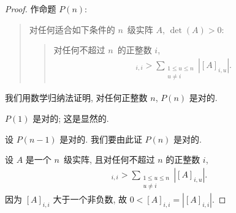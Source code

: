 \documentclass[../libro.tex]{subfiles}
\begin{document}
\begin{proof}
    作命题 \(P(n)\):
    \begin{quotation}
        对任何适合如下条件的 \(n\)~级实阵 \(A\),
        \(\det {(A)} > 0\):
        \begin{quotation}
            对任何不超过 \(n\)~的正整数 \(i\),
            \begin{align*}
                [A]_{i,i} >
                \sum_{\substack{1 \leq u \leq n \\
                u \neq i}} {|[A]_{i,u}|}.
            \end{align*}
        \end{quotation}
    \end{quotation}
    我们用数学归纳法证明,
    对任何正整数 \(n\),
    \(P(n)\) 是对的.

    \(P(1)\) 是对的; 这是显然的.

    设 \(P(n-1)\) 是对的.
    我们要由此证 \(P(n)\) 是对的.

    设 \(A\) 是一个 \(n\)~级实阵,
    且对任何不超过 \(n\) 的正整数 \(i\),
    \begin{align*}
        [A]_{i,i} >
        \sum_{\substack{1 \leq u \leq n \\
        u \neq i}} {|[A]_{i,u}|}.
    \end{align*}
    因为 \([A]_{i,i}\) 大于一个非负数,
    故 \(0 < [A]_{i,i} = |[A]_{i,i}|\).


\end{proof}
\end{document}
